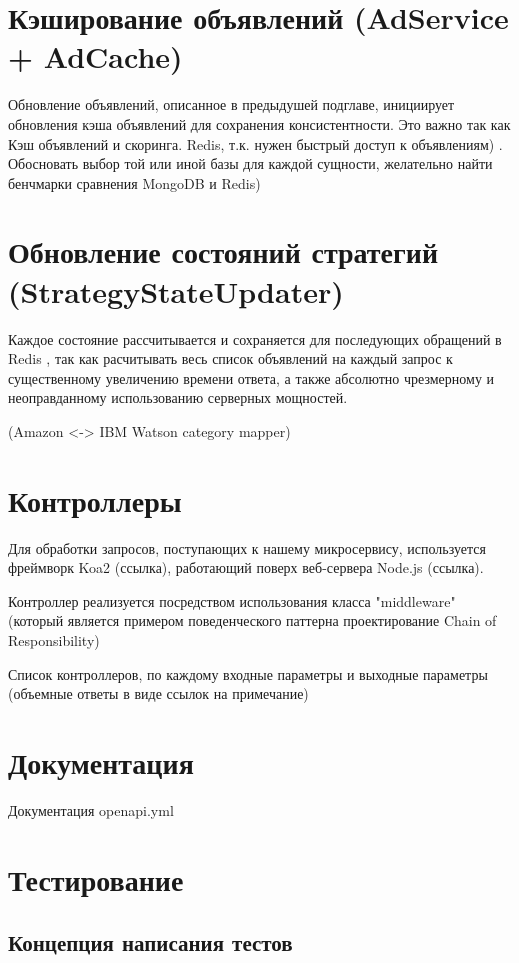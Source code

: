 \documentclass[times]{itmo-student-thesis}
\begin{document}
\section{Кэширование объявлений (AdService + AdCache)}

Обновление объявлений, описанное в предыдушей подглаве, инициирует обновления кэша объявлений для сохранения консистентности. Это важно так как 
Кэш объявлений и скоринга. Redis, т.к. нужен быстрый доступ к объявлениям) . Обосновать выбор той или иной базы для каждой сущности, желательно найти бенчмарки сравнения MongoDB и Redis)

\section{Обновление состояний стратегий (StrategyStateUpdater)}

Каждое состояние рассчитывается и сохраняется для последующих обращений в Redis , так как расчитывать весь список объявлений на каждый запрос к существенному увеличению времени ответа, а также абсолютно чрезмерному и неоправданному использованию серверных мощностей.

(Amazon <-> IBM Watson category mapper)

\section{Контроллеры}

Для обработки запросов, поступающих к нашему микросервису, используется фреймворк Koa2 (ссылка), работающий поверх веб-сервера Node.js (ссылка).

Контроллер реализуется посредством использования класса "middleware" (который является примером поведенческого паттерна проектирование Chain of Responsibility)

Список контроллеров, по каждому входные параметры и выходные параметры (объемные ответы в виде ссылок на примечание)

\section{Документация}

Документация openapi.yml


\section{Тестирование}

\subsection{Концепция написания тестов}
\end{document}
